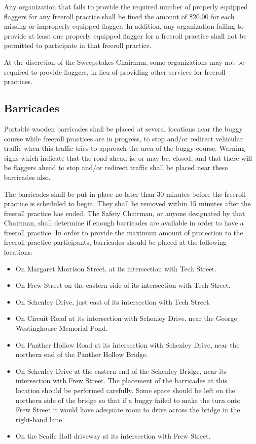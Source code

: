 \documentclass[openany]{book}
\begin{document}
Any organization that fails to provide the required number of properly equipped flaggers for any freeroll practice shall be fined the amount of \$20.00 for each missing or improperly equipped flagger. In addition, any organization failing to provide at least one properly equipped flagger for a freeroll practice shall not be permitted to participate in that freeroll practice.

At the discretion of the Sweepstakes Chairman, some organizations may not be required to provide flaggers, in lieu of providing other services for freeroll practices.

\subsection{Barricades}

Portable wooden barricades shall be placed at several locations near the buggy course while freeroll practices are in progress, to stop and/or redirect vehicular traffic when this traffic tries to approach the area of the buggy course. Warning signs which indicate that the road ahead is, or may be, closed, and that there will be flaggers ahead to stop and/or redirect traffic shall be placed near these barricades also.

The barricades shall be put in place no later than 30 minutes before the freeroll practice is scheduled to begin. They shall be removed within 15 minutes after the freeroll practice has ended. The Safety Chairman, or anyone designated by that Chairman, shall determine if enough barricades are available in order to have a freeroll practice. In order to provide the maximum amount of protection to the freeroll practice participants, barricades should be placed at the following locations:
\begin{itemize}
	\item On Margaret Morrison Street, at its intersection with Tech Street.
	\item On Frew Street on the eastern side of its intersection with Tech Street.
	\item On Schenley Drive, just east of its intersection with Tech Street.
	\item On Circuit Road at its intersection with Schenley Drive, near the George Westinghouse Memorial Pond.
	\item On Panther Hollow Road at its intersection with Schenley Drive, near the northern end of the Panther Hollow Bridge.
	\item On Schenley Drive at the eastern end of the Schenley Bridge, near its intersection with Frew Street. The placement of the barricades at this location should be performed carefully. Some space should be left on the northern side of the bridge so that if a buggy failed to make the turn onto Frew Street it would have adequate room to drive across the bridge in the right-hand lane.
	\item On the Scaife Hall driveway at its intersection with Frew Street.
\end{itemize}
\end{document}
